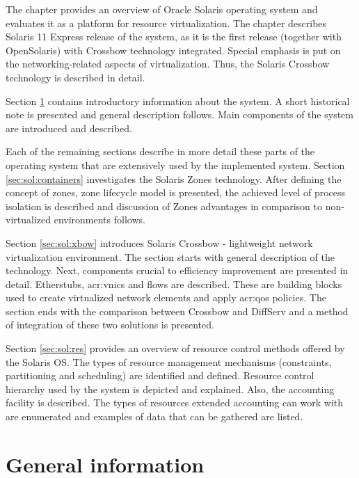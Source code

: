 \documentclass[11pt]{book}
\begin{document}

    The chapter provides an overview of Oracle Solaris operating system and evaluates it as a platform for resource
    virtualization. The chapter describes Solaris 11 Express release of the system, as it is the first release (together
    with OpenSolaris) with Crossbow technology integrated. Special emphasis is put on the networking-related aspects of
    virtualization. Thus, the Solaris Crossbow technology is described in detail.

    Section \ref{sec:sol:general} contains introductory information about the system. A short historical note is
    presented and general description follows. Main components of the system are introduced and described.
    
    Each of the remaining sections describe in more detail these parts of the operating system that are extensively used
    by the implemented system. Section \ref{sec:sol:containers} investigates the Solaris Zones technology. After
    defining the concept of zones, zone lifecycle model is presented, the achieved level of process isolation is
    described and discussion of Zones advantages in comparison to non-virtualized environments follows.

    Section \ref{sec:sol:xbow} introduces Solaris Crossbow - lightweight network virtualization environment. The section
    starts with general description of the technology. Next, components crucial to efficiency improvement are presented
    in detail. Etherstubs, \gls{acr:vnic}s and flows are described. These are building blocks used to create virtualized
    network elements and apply \gls{acr:qos} policies. The section ends with the comparison between Crossbow and
    DiffServ and a method of integration of these two solutions is presented.

    Section \ref{sec:sol:res} provides an overview of resource control methods offered by the Solaris OS. The types of
    resource management mechanisms (constraints, partitioning and scheduling) are identified and defined. Resource
    control hierarchy used by the system is depicted and explained. Also, the accounting facility is described. The
    types of resources extended accounting can work with are enumerated and examples of data that can be gathered are
    listed.


    \section{General information}
    \label{sec:sol:general}
\end{document}
